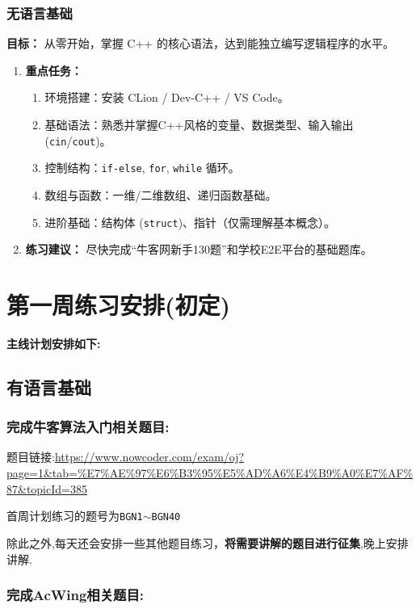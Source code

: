\subsubsection{无语言基础}
\textbf{目标：} 从零开始，掌握 C++ 的核心语法，达到能独立编写逻辑程序的水平。
\begin{enumerate}
    \item \textbf{重点任务：}
        \begin{enumerate}
            \item 环境搭建：安装 CLion / Dev-C++ / VS Code。
            \item 基础语法：熟悉并掌握C++风格的变量、数据类型、输入输出 (\texttt{cin}/\texttt{cout})。
            \item 控制结构：\texttt{if-else}, \texttt{for}, \texttt{while} 循环。
            \item 数组与函数：一维/二维数组、递归函数基础。
            \item 进阶基础：结构体 (\texttt{struct})、指针（仅需理解基本概念）。
        \end{enumerate}
    \item \textbf{练习建议：} 尽快完成“牛客网新手130题”和学校E2E平台的基础题库。
\end{enumerate}

\newpage


\section{第一周练习安排(初定)}

\textbf{主线计划安排如下:}

\subsection{有语言基础}

\subsubsection{完成牛客算法入门相关题目:}

题目链接:\url{https://www.nowcoder.com/exam/oj?page=1&tab=%E7%AE%97%E6%B3%95%E5%AD%A6%E4%B9%A0%E7%AF%87&topicId=385}

首周计划练习的题号为\texttt{BGN1$\sim$BGN40}

除此之外,每天还会安排一些其他题目练习，\textbf{将需要讲解的题目进行征集},晚上安排讲解.

\subsubsection{完成AcWing相关题目:}

